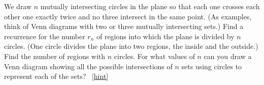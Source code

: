 \documentclass{book}
\begin{document}
\setcounter{project}{138}
\addtocounter{project}{-1}
\begin{activity}[]\label{circlesinplane}
\hypertarget{p-953}{}%
We draw \(n\) mutually intersecting circles in the plane so that each one crosses each other one exactly twice and no three intersect in the same point. (As examples, think of Venn diagrams with two or three mutually intersecting sets.) Find a recurrence for the number \(r_n\) of regions into which the plane is divided by \(n\) circles. (One circle divides the plane into two regions, the inside and the outside.) Find the number of regions with \(n\) circles. For what values of \(n\) can you draw a Venn diagram showing all the possible intersections of \(n\) sets using circles to represent each of the sets?%
~\hfill{\tiny\hyperlink{a-138}{[hint]}\hypertarget{q-138}{}}\end{activity}
\end{document}
